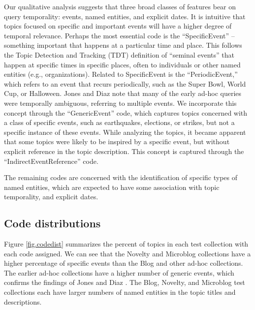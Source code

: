 \documentclass{sig-alternate}
\begin{document}
Our qualitative analysis suggests that three broad classes of features bear on query temporality: events, named entities, and explicit dates. It is intuitive that topics focused on specific and important events will have a higher degree of temporal relevance. Perhaps the most essential code is the ``SpecificEvent'' -- something important that happens at a particular time and place.  This follows the Topic Detection and Tracking (TDT) definition \cite{TDT2004} of ``seminal events'' that happen at specific times in specific places, often to individuals or other named entities (e.g., organizations).  Related to SpecificEvent is the ``PeriodicEvent,'' which refers to an event that recurs periodically, such as the Super Bowl, World Cup, or Halloween. Jones and Diaz \cite{Jones2007} note that many of the early ad-hoc queries were temporally ambiguous, referring to multiple events. We incorporate this concept through the ``GenericEvent'' code, which captures topics concerned with a class of specific events, such as earthquakes, elections, or strikes, but not a specific instance of these events.  While analyzing the topics, it became apparent that some topics were likely to be inspired by a specific event, but without explicit reference in the topic description. This concept is captured through the ``IndirectEventReference'' code. 
 
 
The remaining codes are concerned with the identification of specific types of named entities, which are expected to have some  association with topic temporality, and explicit dates.


\subsection{Code distributions}

Figure \ref{fig.codedist} summarizes the percent of topics in each test collection with each code assigned. We can see that the Novelty and Microblog  collections have a higher percentage of specific events than the Blog and other ad-hoc collections. The earlier ad-hoc collections have a higher number of generic events, which confirms the findings of Jones and Diaz \cite{Jones2007}. The Blog, Novelty, and Microblog test collections each have larger numbers of named entities in the topic titles and descriptions.
\end{document}
